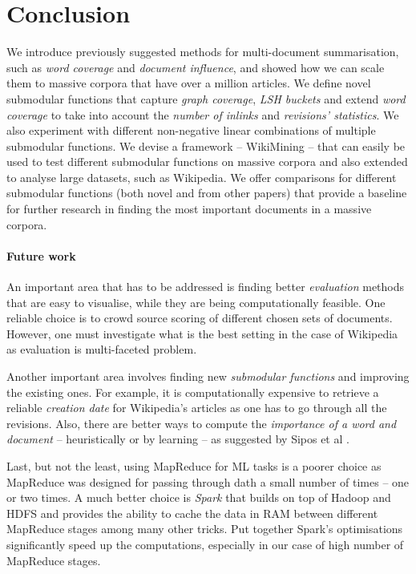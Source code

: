 \chapter{Conclusion}

We introduce previously suggested methods for multi-document summarisation,
such as \emph{word coverage} and \emph{document influence}, and showed how we
can scale them to massive corpora that have over a million articles.
We define novel submodular functions that capture \emph{graph coverage},
\emph{\ac{LSH} buckets} and extend \emph{word coverage} to take into account
the \emph{number of inlinks} and \emph{revisions' statistics}.
We also experiment with different non-negative linear combinations of
multiple submodular functions.
We devise a framework -- WikiMining -- that can easily be used to test
different submodular functions on massive corpora and also extended to analyse
large datasets, such as Wikipedia.
We offer comparisons for different submodular functions (both novel and from
other papers) that provide a baseline for further research in finding the most
important documents in a massive corpora.

\subsubsection{Future work}
\label{sec:future-work}

An important area that has to be addressed is finding better \emph{evaluation}
methods that are easy to visualise, while they are being computationally
feasible.
One reliable choice is to crowd source scoring of different chosen sets of
documents.
However, one must investigate what is the best setting in the case of Wikipedia
as evaluation is multi-faceted problem.

Another important area involves finding new \emph{submodular
functions} and improving the existing ones.
For example, it is computationally expensive to retrieve a reliable
\emph{creation date} for Wikipedia's articles as one has to go through all the
revisions.
Also, there are better ways to compute the \emph{importance of a word and
document} -- heuristically \cite{lin2010multi} or by learning
\cite{sipos2012large} -- as suggested by Sipos et al \cite{sipos2012temporal}.

Last, but not the least, using MapReduce for \acl{ML} tasks is a poorer choice
as MapReduce was designed for passing through dath a small number of times --
one or two times.
A much better choice is \emph{Spark} that builds on top of Hadoop and \ac{HDFS}
and provides the ability to cache the data in \ac{RAM} between different
MapReduce stages among many other tricks.
Put together Spark's optimisations significantly speed up the computations,
especially in our case of high number of MapReduce stages.

